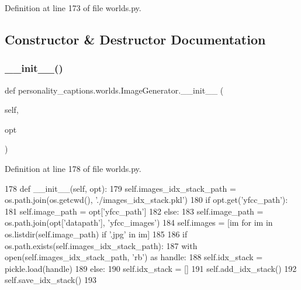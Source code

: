 Definition at line 173 of file worlds.\+py.



\subsection{Constructor \& Destructor Documentation}
\mbox{\label{classpersonality__captions_1_1worlds_1_1ImageGenerator_adeb74aa2ebf4ace2c39ab7f811629b98}} 
\subsubsection{\texorpdfstring{\+\_\+\+\_\+init\+\_\+\+\_\+()}{\_\_init\_\_()}}
{\footnotesize\ttfamily def personality\+\_\+captions.\+worlds.\+Image\+Generator.\+\_\+\+\_\+init\+\_\+\+\_\+ (\begin{DoxyParamCaption}\item[{}]{self,  }\item[{}]{opt }\end{DoxyParamCaption})}



Definition at line 178 of file worlds.\+py.


\begin{DoxyCode}
178     \textcolor{keyword}{def }\_\_init\_\_(self, opt):
179         self.images\_idx\_stack\_path = os.path.join(os.getcwd(), \textcolor{stringliteral}{'./images\_idx\_stack.pkl'})
180         \textcolor{keywordflow}{if} opt.get(\textcolor{stringliteral}{'yfcc\_path'}):
181             self.image\_path = opt[\textcolor{stringliteral}{'yfcc\_path'}]
182         \textcolor{keywordflow}{else}:
183             self.image\_path = os.path.join(opt[\textcolor{stringliteral}{'datapath'}], \textcolor{stringliteral}{'yfcc\_images'})
184         self.images = [im \textcolor{keywordflow}{for} im \textcolor{keywordflow}{in} os.listdir(self.image\_path) \textcolor{keywordflow}{if} \textcolor{stringliteral}{'.jpg'} \textcolor{keywordflow}{in} im]
185 
186         \textcolor{keywordflow}{if} os.path.exists(self.images\_idx\_stack\_path):
187             with open(self.images\_idx\_stack\_path, \textcolor{stringliteral}{'rb'}) \textcolor{keyword}{as} handle:
188                 self.idx\_stack = pickle.load(handle)
189         \textcolor{keywordflow}{else}:
190             self.idx\_stack = []
191             self.add\_idx\_stack()
192             self.save\_idx\_stack()
193 
\end{DoxyCode}


